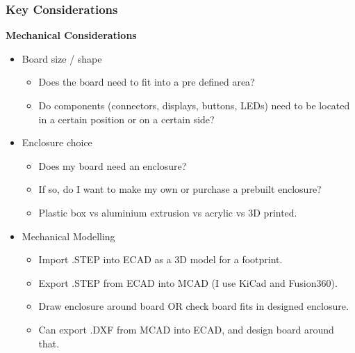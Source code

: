 \documentclass[t]{beamer}
\begin{document}
\begin{frame}
\frametitle{Key Considerations}
\large{\textbf{Mechanical Considerations}}
\vspace{1mm}
\begin{itemize}
	\item Board size / shape
	\begin{itemize}
		\item Does the board need to fit into a pre defined area?
		\item Do components (connectors, displays, buttons, LEDs) need to be located in a certain position or on a certain side?
	\end{itemize}
	\item Enclosure choice
	\begin{itemize}
		\item Does my board need an enclosure?
		\item If so, do I want to make my own or purchase a prebuilt enclosure?
		\item Plastic box vs aluminium extrusion vs acrylic vs 3D printed. 
	\end{itemize}
	\item Mechanical Modelling 
	\begin{itemize}
		\item Import .STEP into ECAD as a 3D model for a footprint.
		\item Export .STEP from ECAD into MCAD (I use KiCad and Fusion360).
		\item Draw enclosure around board OR check board fits in designed enclosure.
		\item Can export .DXF from MCAD into ECAD, and design board around that. 
	\end{itemize}
\end{itemize}
\end{frame}

\end{document}
